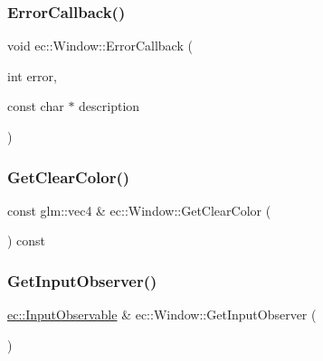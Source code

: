 \subsubsection{\texorpdfstring{Error\+Callback()}{ErrorCallback()}}
{\footnotesize\ttfamily void ec\+::\+Window\+::\+Error\+Callback (\begin{DoxyParamCaption}\item[{int}]{error,  }\item[{const char $\ast$}]{description }\end{DoxyParamCaption})\hspace{0.3cm}{\ttfamily [static]}}

\mbox{\label{classec_1_1_window_aa87fd9b3042657bc41461c1234296847}} 
\subsubsection{\texorpdfstring{Get\+Clear\+Color()}{GetClearColor()}}
{\footnotesize\ttfamily const glm\+::vec4 \& ec\+::\+Window\+::\+Get\+Clear\+Color (\begin{DoxyParamCaption}{ }\end{DoxyParamCaption}) const}

\mbox{\label{classec_1_1_window_a0f2af2fca7c4c20d027acf6afaf79b99}} 
\subsubsection{\texorpdfstring{Get\+Input\+Observer()}{GetInputObserver()}}
{\footnotesize\ttfamily \mbox{\hyperlink{classec_1_1_input_observable}{ec\+::\+Input\+Observable}} \& ec\+::\+Window\+::\+Get\+Input\+Observer (\begin{DoxyParamCaption}{ }\end{DoxyParamCaption})}

\mbox{\label{classec_1_1_window_aad83b5eb3bb0708c08503ac3c6b7b670}} 
